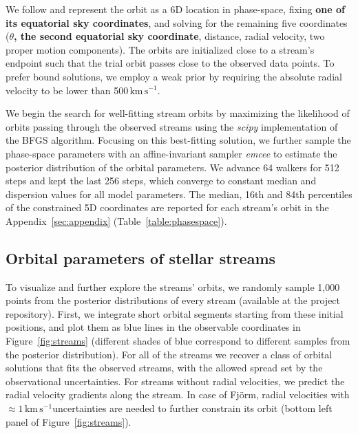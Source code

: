 \documentclass[twocolumn]{aastex63}
\newcommand{\package}[1]{\textsl{#1}}
\newcommand{\kms}{\ensuremath{\textrm{km}\,\textrm{s}^{-1}}}
\newcommand{\changes}[1]{{\textbf{#1}}}
\begin{document}
We follow \citet{pwb} and represent the orbit as a 6D location in phase-space, fixing \changes{one of its equatorial sky coordinates}, and solving for the remaining five coordinates (\changes{$\theta$, the second equatorial sky coordinate}, distance, radial velocity, two proper motion components).
The orbits are initialized close to a stream's endpoint such that the trial orbit passes close to the observed data points.
To prefer bound solutions, we employ a weak prior by requiring the absolute radial velocity to be lower than 500\,\kms.

We begin the search for well-fitting stream orbits by maximizing the likelihood of orbits passing through the observed streams using the \package{scipy} implementation of the BFGS algorithm.
Focusing on this best-fitting solution, we further sample the phase-space parameters with an affine-invariant sampler \package{emcee} to estimate the posterior distribution of the orbital parameters.
We advance 64 walkers for 512 steps and kept the last 256 steps, which converge to constant median and dispersion values for all model parameters.
The median, 16th and 84th percentiles of the constrained 5D coordinates are reported for each stream's orbit in the Appendix~\ref{sec:appendix} (Table~\ref{table:phasespace}).


\subsection{Orbital parameters of stellar streams}
To visualize and further explore the streams' orbits, we randomly sample 1,000 points from the posterior distributions of every stream (available at the project repository).
First, we integrate short orbital segments starting from these initial positions, and plot them as blue lines in the observable coordinates in Figure~\ref{fig:streams} (different shades of blue correspond to different samples from the posterior distribution).
For all of the streams we recover a class of orbital solutions that fits the observed streams, with the allowed spread set by the observational uncertainties.
For streams without radial velocities, we predict the radial velocity gradients along the stream.
In case of Fj\" orm, radial velocities with $\approx1$\,\kms uncertainties are needed to further constrain its orbit (bottom left panel of Figure~\ref{fig:streams}).
\end{document}
